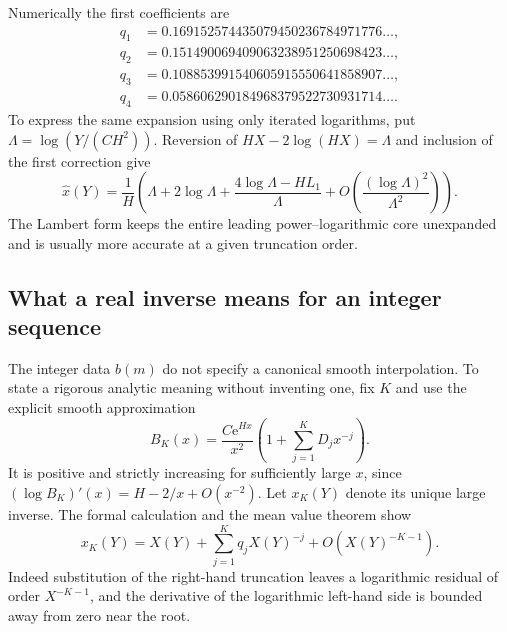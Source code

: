 \documentclass[11pt,a4paper]{article}
\numberwithin{equation}{section}
\theoremstyle{definition}
\theoremstyle{remark}
\newcommand{\e}{\mathrm e}
\begin{document}
Numerically the first coefficients are
\begin{align*}
 q_1&=0.169152574435079450236784971776\ldots,\\
 q_2&=0.151490069409063238951250698423\ldots,\\
 q_3&=0.108853991540605915550641858907\ldots,\\
 q_4&=0.058606290184968379522730931714\ldots.
\end{align*}
To express the same expansion using only iterated logarithms, put
$\Lambda=\log(Y/(CH^2))$. Reversion of
$HX-2\log(HX)=\Lambda$ and inclusion of the first correction give
\begin{equation}
 \widehat x(Y)=\frac1H\left(
 \Lambda+2\log\Lambda+
 \frac{4\log\Lambda-HL_1}{\Lambda}
 +O\left(\frac{(\log\Lambda)^2}{\Lambda^2}\right)\right).
 \label{srp:eq:log-inverse}
\end{equation}
The Lambert form keeps the entire leading power--logarithmic core
unexpanded and is usually more accurate at a given truncation order.

\subsection{What a real inverse means for an integer sequence}
The integer data $b(m)$ do not specify a canonical smooth interpolation.
To state a rigorous analytic meaning without inventing one, fix $K$ and
use the explicit smooth approximation
\begin{equation}
 B_K(x)=\frac{C\e^{Hx}}{x^2}
 \left(1+\sum_{j=1}^K D_jx^{-j}\right).
 \label{srp:eq:BK}
\end{equation}
It is positive and strictly increasing for sufficiently large $x$, since
$(\log B_K)'(x)=H-2/x+O(x^{-2})$. Let $x_K(Y)$ denote its unique large
inverse. The formal calculation and the mean value theorem show
\begin{equation}
 x_K(Y)=X(Y)+\sum_{j=1}^K q_jX(Y)^{-j}+O(X(Y)^{-K-1}).
 \label{srp:eq:real-inverse}
\end{equation}
Indeed substitution of the right-hand truncation leaves a logarithmic
residual of order $X^{-K-1}$, and the derivative of the logarithmic
left-hand side is bounded away from zero near the root.
\end{document}
